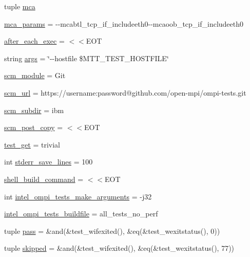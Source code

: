\begin{DoxyCompactItemize}
tuple \hyperlink{namespaceompi-core-template_a8bec0c2630d37f5891ff642df3f9de76}{mca}
\item 
\hyperlink{namespaceompi-core-template_a3972657d18b13fbec48e9fc366ff07f0}{mca\-\_\-params} = -\/-\/mcabtl\-\_\-tcp\-\_\-if\-\_\-includeeth0-\/-\/mcaoob\-\_\-tcp\-\_\-if\-\_\-includeeth0
\item 
\hyperlink{namespaceompi-core-template_abbdf846bd4f4a4b6f3e7a6933e678f17}{after\-\_\-each\-\_\-exec} = $<$$<$E\-O\-T
\item 
string \hyperlink{namespaceompi-core-template_ae07cf7e00726c06dc500a54b713819c8}{args} = \char`\"{}-\/-\/hostfile \$M\-T\-T\-\_\-\-T\-E\-S\-T\-\_\-\-H\-O\-S\-T\-F\-I\-L\-E\char`\"{}
\item 
\hyperlink{namespaceompi-core-template_afa2204401b4cd6514dd6997ff3f38dc6}{scm\-\_\-module} = Git
\item 
\hyperlink{namespaceompi-core-template_a2ed15964d614776a50965e42acd911ec}{scm\-\_\-url} = https\-://username\-:password@github.\-com/open-\/mpi/ompi-\/tests.\-git
\item 
\hyperlink{namespaceompi-core-template_a5373b4e1981d8856efbaed9c52074bae}{scm\-\_\-subdir} = ibm
\item 
\hyperlink{namespaceompi-core-template_a8a118b9a1ada232fcd1d1f042d7d00ab}{scm\-\_\-post\-\_\-copy} = $<$$<$E\-O\-T
\item 
\hyperlink{namespaceompi-core-template_a075a5d52fcb2adb80f97aecc076193cd}{test\-\_\-get} = trivial
\item 
int \hyperlink{namespaceompi-core-template_acd0619b0cba198ab183cab48b2cd2871}{stderr\-\_\-save\-\_\-lines} = 100
\item 
\hyperlink{namespaceompi-core-template_a4cde9a1f50b8bdd6e68415d96d2ffdea}{shell\-\_\-build\-\_\-command} = $<$$<$E\-O\-T
\item 
int \hyperlink{namespaceompi-core-template_a40c7b7a488e20c19bcf9d376fc8c0020}{intel\-\_\-ompi\-\_\-tests\-\_\-make\-\_\-arguments} = -\/j32
\item 
\hyperlink{namespaceompi-core-template_a9a520c9ab3479f4c752dd61fa30f84ad}{intel\-\_\-ompi\-\_\-tests\-\_\-buildfile} = all\-\_\-tests\-\_\-no\-\_\-perf
\item 
tuple \hyperlink{namespaceompi-core-template_ae24ed89eb7dedea4e66bcbf9b4269705}{pass} = \&and(\&test\-\_\-wifexited(), \&eq(\&test\-\_\-wexitstatus(), 0))
\item 
tuple \hyperlink{namespaceompi-core-template_ab8fdea3dca63a8df3e8266e6fdd62f08}{skipped} = \&and(\&test\-\_\-wifexited(), \&eq(\&test\-\_\-wexitstatus(), 77))
$$
\end{DoxyCompactItemize}
